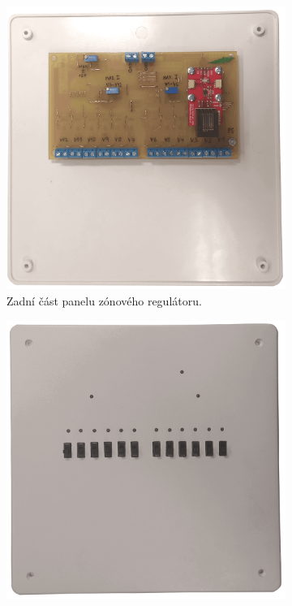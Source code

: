 \begin{figure}[H]
\centering
\begin{subfigure}{.5\textwidth}
  \centering
  \includegraphics[width=\textwidth]{images/zonovy-regulator/zonovy-regulator-spodni-strana.png}
  \caption{Zadní část panelu zónového regulátoru. \newline \newline}
  \label{fig:zonovy-regulator-spodni-strana}
\end{subfigure}%
\begin{subfigure}{.5\textwidth}
  \centering
  \includegraphics[width=\textwidth]{images/zonovy-regulator/zonovy-regulator-vrchni-strana.png}

\end{subfigure}
\end{figure}
